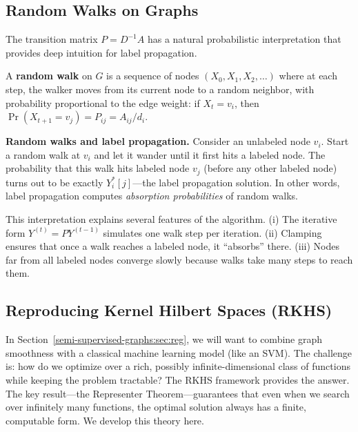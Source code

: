\begin{notechapter}
\subsection{Random Walks on Graphs}
\label{semi-supervised-graphs:subsec:random_walks}

The transition matrix $P = D^{-1}A$ has a natural probabilistic interpretation
that provides deep intuition for label propagation.

\begin{definition}
A \textbf{random walk} on $G$ is a sequence of nodes $(X_0, X_1, X_2, \ldots)$
where at each step, the walker moves from its current node to a random
neighbor, with probability proportional to the edge weight:
if $X_t = v_i$, then $\Pr(X_{t+1} = v_j) = P_{ij} = A_{ij}/d_i$.
\end{definition}

\begin{insightbox}
\textbf{Random walks and label propagation.}
Consider an unlabeled node $v_i$. Start a random walk at $v_i$ and let it
wander until it first hits a labeled node. The probability that this walk hits
labeled node $v_j$ (before any other labeled node) turns out to be exactly
$Y_i^*[j]$---the label propagation solution. In other words, label propagation
computes \emph{absorption probabilities} of random walks.

This interpretation explains several features of the algorithm. (i) The
iterative form $Y^{(t)} = PY^{(t-1)}$ simulates one walk step per iteration.
(ii) Clamping ensures that once a walk reaches a labeled node, it ``absorbs''
there. (iii) Nodes far from all labeled nodes converge slowly because walks
take many steps to reach them.
\end{insightbox}

\subsection{Reproducing Kernel Hilbert Spaces (RKHS)}
\label{semi-supervised-graphs:subsec:rkhs}

In Section~\ref{semi-supervised-graphs:sec:reg}, we will want to combine graph smoothness with a
classical machine learning model (like an SVM). The challenge is: how do we
optimize over a rich, possibly infinite-dimensional class of functions while
keeping the problem tractable? The RKHS framework provides the answer. The key
result---the Representer Theorem---guarantees that even when we search over
infinitely many functions, the optimal solution always has a finite,
computable form. We develop this theory here.


\end{notechapter}
